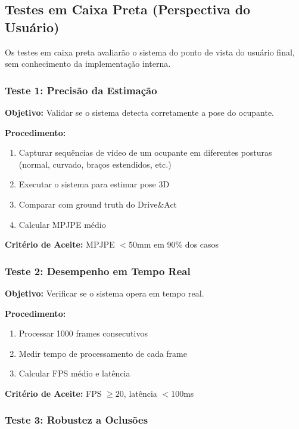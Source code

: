 \documentclass[12pt, a4paper]{article}
\begin{document}
\subsection{Testes em Caixa Preta (Perspectiva do Usuário)}

Os testes em caixa preta avaliarão o sistema do ponto de vista do usuário final, sem conhecimento da implementação interna.

\subsubsection{Teste 1: Precisão da Estimação}

\textbf{Objetivo:} Validar se o sistema detecta corretamente a pose do ocupante.

\noindent\textbf{Procedimento:}
\begin{enumerate}
    \item Capturar sequências de vídeo de um ocupante em diferentes posturas (normal, curvado, braços estendidos, etc.)
    \item Executar o sistema para estimar pose 3D
    \item Comparar com ground truth do Drive\&Act
    \item Calcular MPJPE médio
\end{enumerate}

\noindent\textbf{Critério de Aceite:} MPJPE $< 50$mm em 90\% dos casos

\subsubsection{Teste 2: Desempenho em Tempo Real}

\textbf{Objetivo:} Verificar se o sistema opera em tempo real.

\noindent\textbf{Procedimento:}
\begin{enumerate}
    \item Processar 1000 frames consecutivos
    \item Medir tempo de processamento de cada frame
    \item Calcular FPS médio e latência
\end{enumerate}

\noindent\textbf{Critério de Aceite:} FPS $\geq 20$, latência $< 100$ms

\subsubsection{Teste 3: Robustez a Oclusões}
\end{document}
